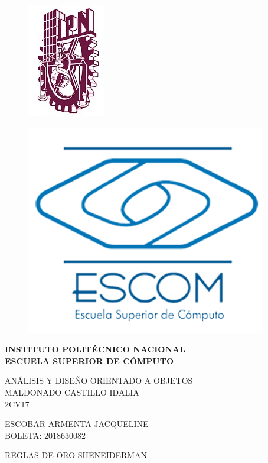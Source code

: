 \documentclass[14pt]{article}
\begin{document}
    \begin{center}

        \begin{figure}[htbl!]
            \begin{minipage}[b]{0.5\linewidth}
                \includegraphics[height=0.4\textwidth]{IPN.jpg}
                \label{fig:IPN}
            \end{minipage}
            \hspace{2.5cm}
            \begin{minipage}[b]{0.5\linewidth}
                \centering
                \includegraphics[height=0.4\textwidth]{ESCOM.png}
                \label{fig:ESCOM}
            \end{minipage}
        \end{figure}

        \vspace{1cm}

        \fontsize{14}{baseline skip}\textbf{INSTITUTO POLITÉCNICO NACIONAL \\
        \vspace{0.3cm}ESCUELA SUPERIOR DE CÓMPUTO}

        \vspace{3cm}

        \fontsize{14}{baseline skip} ANÁLISIS Y DISEÑO ORIENTADO A OBJETOS\\ \vspace{0.5cm}MALDONADO CASTILLO IDALIA\\ \vspace{0.5cm}2CV17

        \vspace{3cm}

        \fontsize{14}{baseline skip}ESCOBAR ARMENTA JACQUELINE\\ \vspace{0.5cm}BOLETA: 2018630082

        \vspace{3cm}

        \fontsize{14}{baseline skip}REGLAS DE ORO SHENEIDERMAN

    \end{center}
\end{document}
